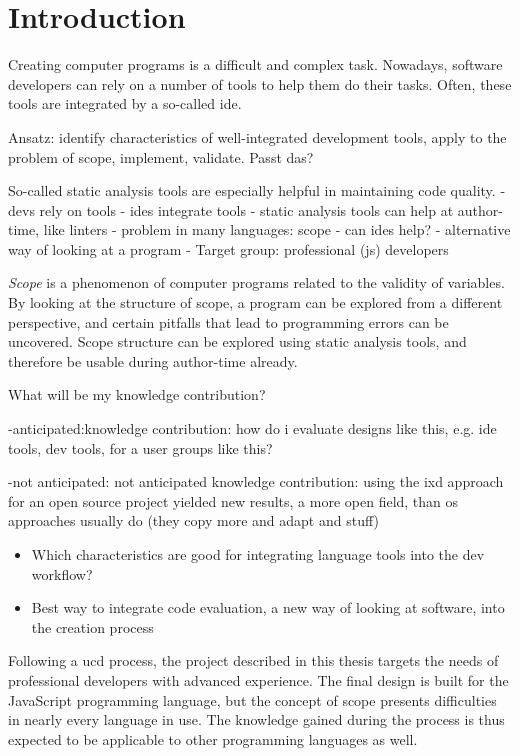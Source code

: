 \chapter{Introduction}\label{introduction}

Creating computer programs is a difficult and complex task. Nowadays,
software developers can rely on a number of tools to help them do their
tasks. Often, these tools are integrated by a so-called \ac{ide}.

Ansatz: identify characteristics of well-integrated development tools,
apply to the problem of scope, implement, validate. Passt das?

So-called static analysis tools are especially helpful in maintaining
code quality. - devs rely on tools - ides integrate tools - static
analysis tools can help at author-time, like linters - problem in many
languages: scope - can ides help? - alternative way of looking at a
program - Target group: professional (js) developers

\emph{Scope} is a phenomenon of computer programs related to the
validity of variables. By looking at the structure of scope, a program
can be explored from a different perspective, and certain pitfalls that
lead to programming errors can be uncovered. Scope structure can be
explored using static analysis tools, and therefore be usable during
author-time already.

What will be my knowledge contribution?

-anticipated:knowledge contribution: how do i evaluate designs like
this, e.g. ide tools, dev tools, for a user groups like this?

-not anticipated: not anticipated knowledge contribution: using the ixd
approach for an open source project yielded new results, a more open
field, than os approaches usually do (they copy more and adapt and
stuff)

\begin{itemize}
\itemsep1pt\parskip0pt
\item
  Which characteristics are good for integrating language tools into the
  dev workflow?
\item
  Best way to integrate code evaluation, a new way of looking at
  software, into the creation process
\end{itemize}

Following a \ac{ucd} process, the project described in this thesis
targets the needs of professional developers with advanced experience.
The final design is built for the JavaScript programming language, but
the concept of scope presents difficulties in nearly every language in
use. The knowledge gained during the process is thus expected to be
applicable to other programming languages as well.

